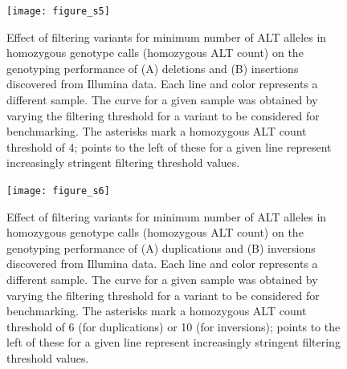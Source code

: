\documentclass[12pt]{article}
\newenvironment{cfigure}
	{\begin{figure} \centering}
	{\end{figure}}
\begin{document}
\clearpage%

\begin{cfigure}
	\texttt{[image: figure\_s5]}

	\caption[Effect of homozygous ALT count on genotyping performance of Illumina deletions and insertions]{
		Effect of filtering variants for minimum number of ALT alleles in homozygous genotype calls (homozygous ALT count) on the genotyping performance of (A) deletions and (B) insertions discovered from Illumina data.
		Each line and color represents a different sample.
		The curve for a given sample was obtained by varying the filtering threshold for a variant to be considered for benchmarking.
		The asterisks mark a homozygous ALT count threshold of 4; points to the left of these for a given line represent increasingly stringent filtering threshold values.
	}

	\label{fig_s5}

\end{cfigure}

\clearpage%

\begin{cfigure}
	\texttt{[image: figure\_s6]}

	\caption[Effect of homozygous ALT count on genotyping performance of Illumina duplications and inversions]{
		Effect of filtering variants for minimum number of ALT alleles in homozygous genotype calls (homozygous ALT count) on the genotyping performance of (A) duplications and (B) inversions discovered from Illumina data.
		Each line and color represents a different sample.
		The curve for a given sample was obtained by varying the filtering threshold for a variant to be considered for benchmarking.
		The asterisks mark a homozygous ALT count threshold of 6 (for duplications) or 10 (for inversions); points to the left of these for a given line represent increasingly stringent filtering threshold values.
	}

	\label{fig_s6}

\end{cfigure}

\clearpage%
\end{document}
